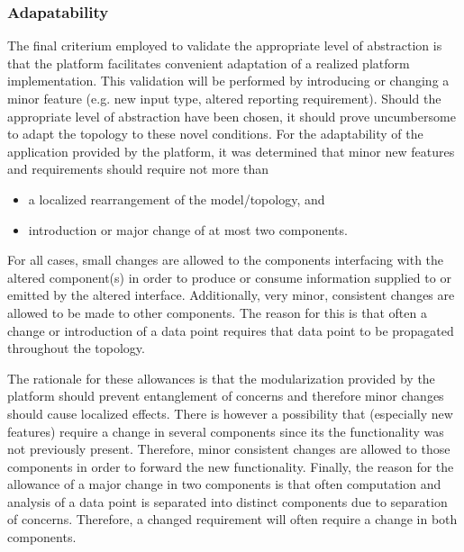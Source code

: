 \subsubsection{Adapatability}
The final criterium employed to validate the appropriate level of abstraction is that the platform facilitates convenient adaptation of a realized platform implementation. This validation will be performed by introducing or changing a minor feature (e.g. new input type, altered reporting requirement). Should the appropriate level of abstraction have been chosen, it should prove uncumbersome to adapt the topology to these novel conditions. For the adaptability of the application provided by the platform, it was determined that minor new features and requirements should require not more than
\begin{itemize}
\nospace
\item a localized rearrangement of the model/topology, and
\item introduction or major change of at most two components.
\end{itemize}
For all cases, small changes are allowed to the components interfacing with the altered component(s) in order to produce or consume information supplied to or emitted by the altered interface. Additionally, very minor, consistent changes are allowed to be made to other components. The reason for this is that often a change or introduction of a data point requires that data point to be propagated throughout the topology.

The rationale for these allowances is that the modularization provided by the platform should prevent entanglement of concerns and therefore minor changes should cause localized effects. There is however a possibility that (especially new features) require a change in several components since its the functionality was not previously present. Therefore, minor consistent changes are allowed to those components in order to forward the new functionality. Finally, the reason for the allowance of a major change in two components is that often computation and analysis of a data point is separated into distinct components due to separation of concerns. Therefore, a changed requirement will often require a change in both components.


